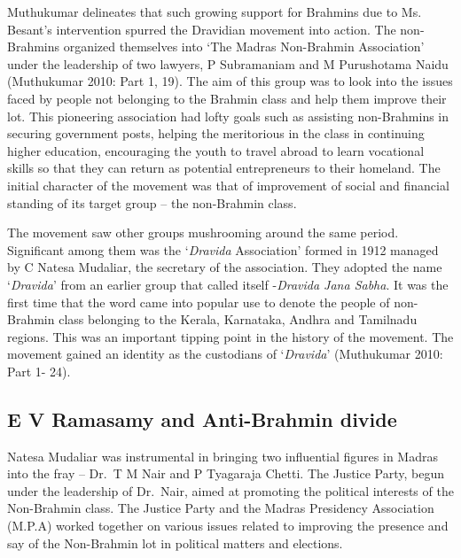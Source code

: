 Muthukumar delineates that such growing support for Brahmins due to Ms. Besant’s intervention spurred the Dravidian movement into action. The non-Brahmins organized themselves into ‘The Madras Non-Brahmin Association’ under the leadership of two lawyers, P Subramaniam and M Purushotama Naidu (Muthukumar 2010: Part 1, 19). The aim of this group was to look into the issues faced by people not belonging to the Brahmin class and help them improve their lot. This pioneering association had lofty goals such as assisting non-Brahmins in securing government posts, helping the meritorious in the class in continuing higher education, encouraging the youth to travel abroad to learn vocational skills so that they can return as potential entrepreneurs to their homeland. The initial character of the movement was that of improvement of social and financial standing of its target group – the non-Brahmin class.

The movement saw other groups mushrooming around the same period. Significant among them was the ‘\textit{Dravida} Association’ formed in 1912 managed by C Natesa Mudaliar, the secretary of the association. They adopted the name ‘\textit{Dravida}’ from an earlier group that called itself -\textit{Dravida Jana Sabha}. It was the first time that the word came into popular use to denote the people of non-Brahmin class belonging to the Kerala, Karnataka, Andhra and Tamilnadu regions. This was an important tipping point in the history of the movement. The movement gained an identity as the custodians of ‘\textit{Dravida}’ (Muthukumar 2010: Part 1- 24).


\subsection*{E V Ramasamy and Anti-Brahmin divide}

Natesa Mudaliar was instrumental in bringing two influential figures in Madras into the fray – Dr.\ T M Nair and P Tyagaraja Chetti. The Justice Party, begun under the leadership of Dr.\ Nair, aimed at promoting the political interests of the Non-Brahmin class. The Justice Party and the Madras Presidency Association (M.P.A) worked together on various issues related to improving the presence and say of the Non-Brahmin lot in political matters and elections.

